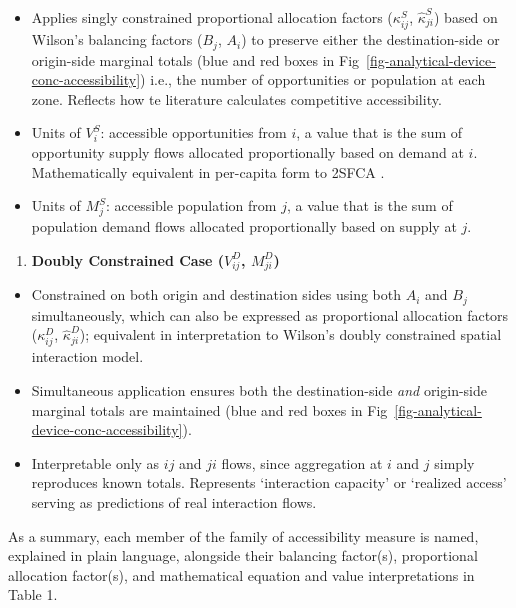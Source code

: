 \documentclass[
  10pt,
  letterpaper,
]{article}
\providecommand{\tightlist}{%
  \setlength{\itemsep}{0pt}\setlength{\parskip}{0pt}}\usepackage{longtable,booktabs,array}
\begin{document}
\begin{itemize}
\tightlist
\item
  Applies singly constrained proportional allocation factors
  (\(\kappa_{ij}^S\), \(\hat \kappa_{ji}^S\)) based on Wilson's
  balancing factors (\(B_j\), \(A_i\)) to preserve either the
  destination-side or origin-side marginal totals (blue and red boxes in
  Fig~\ref{fig-analytical-device-conc-accessibility}) i.e., the number
  of opportunities or population at each zone. Reflects how te
  literature calculates competitive accessibility.
\item
  Units of \(V_i^S\): accessible opportunities from \(i\), a value that
  is the sum of opportunity supply flows allocated proportionally based
  on demand at \(i\). Mathematically equivalent in per-capita form to
  2SFCA \citep{luo2003}.
\item
  Units of \(M_j^S\): accessible population from \(j\), a value that is
  the sum of population demand flows allocated proportionally based on
  supply at \(j\).
\end{itemize}

\begin{enumerate}
\def\labelenumi{\arabic{enumi}.}
\setcounter{enumi}{3}
\tightlist
\item
  \textbf{Doubly Constrained Case (\(V_{ij}^D\), \(M_{ji}^D\))}
\end{enumerate}

\begin{itemize}
\tightlist
\item
  Constrained on both origin and destination sides using both \(A_i\)
  and \(B_j\) simultaneously, which can also be expressed as
  proportional allocation factors (\(\kappa_{ij}^D\),
  \(\hat \kappa_{ji}^D\)); equivalent in interpretation to Wilson's
  \citep{wilson1971} doubly constrained spatial interaction model.
\item
  Simultaneous application ensures both the destination-side \emph{and}
  origin-side marginal totals are maintained (blue and red boxes in
  Fig~\ref{fig-analytical-device-conc-accessibility}).
\item
  Interpretable only as \(ij\) and \(ji\) flows, since aggregation at
  \(i\) and \(j\) simply reproduces known totals. Represents
  `interaction capacity' or `realized access' serving as predictions of
  real interaction flows.
\end{itemize}

As a summary, each member of the family of accessibility measure is
named, explained in plain language, alongside their balancing factor(s),
proportional allocation factor(s), and mathematical equation and value
interpretations in Table 1.
\end{document}
